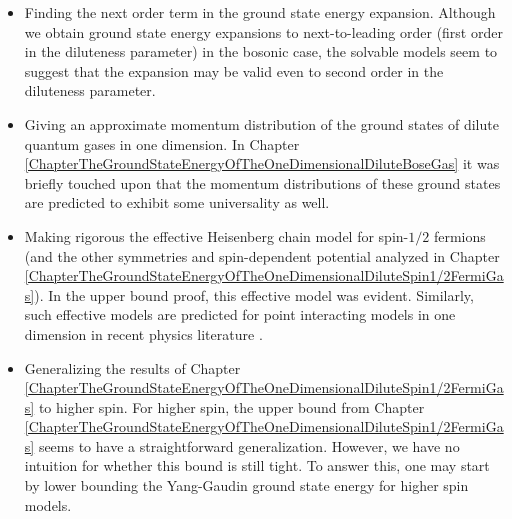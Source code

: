 \begin{itemize}
	\item Finding the next order term in the ground state energy expansion. Although we obtain ground state energy expansions to next-to-leading order (first order in the diluteness parameter) in the bosonic case, the solvable models seem to suggest that the expansion may be valid even to second order in the diluteness parameter.
	\item Giving an approximate momentum distribution of the ground states of dilute quantum gases in one dimension. In Chapter \ref{ChapterTheGroundStateEnergyOfTheOneDimensionalDiluteBoseGas} it was briefly touched upon that the momentum distributions of these ground states are predicted to exhibit some universality as well.
	\item Making rigorous the effective Heisenberg chain model for spin-$ 1/2$ fermions (and the other symmetries and spin-dependent potential analyzed in Chapter \ref{ChapterTheGroundStateEnergyOfTheOneDimensionalDiluteSpin1/2FermiGas}). In the upper bound proof, this effective model was evident. Similarly, such effective models are predicted for point interacting models in one dimension in recent physics literature \cite{yang2016effective,volosniev2015engineering}.
	\item Generalizing the results of Chapter \ref{ChapterTheGroundStateEnergyOfTheOneDimensionalDiluteSpin1/2FermiGas} to higher spin. For higher spin, the upper bound from Chapter \ref{ChapterTheGroundStateEnergyOfTheOneDimensionalDiluteSpin1/2FermiGas} seems to have a straightforward generalization. However, we have no intuition for whether this bound is still tight. To answer this, one may start by lower bounding the Yang-Gaudin ground state energy for higher spin models.
\end{itemize}




